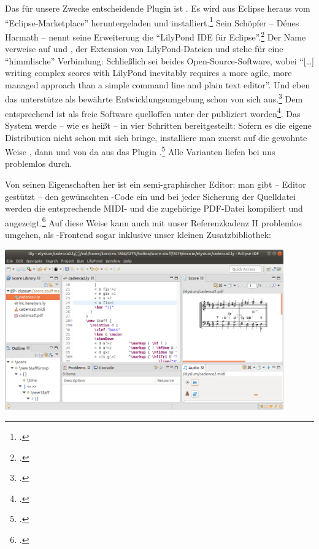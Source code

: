 Das für unsere Zwecke entscheidende Plugin ist . Es wird aus
Eclipse heraus vom \enquote{Eclipse-Marketplace} heruntergeladen und
installiert.\footcite[vgl.][\nopage wp]{Harmath2019a} Sein Schöpfer -- Dénes
Harmath -- nennt seine Erweiterung die \enquote{LilyPond IDE für
Eclipse}.\footcite[vgl.][\nopage wp]{Harmath2019b} Der Name 
verweise auf  und , der Extension von LilyPond-Dateien und
stehe für eine \enquote{himmlische} Verbindung: Schließlich sei beides
Open-Source-Software, wobei \enquote{[\ldots] writing complex scores with
LilyPond inevitably requires a more agile, more managed approach than a simple
command line and plain text editor}. Und eben das unterstütze  als
bewährte Entwicklungsumgebung schon von sich aus.\footcite[vgl.][\nopage
wp]{Harmath2019d} Dem entsprechend ist  als freie Software
quelloffen unter der  publiziert
worden\footcite[vgl.][\nopage wp]{Harmath2018a}. Das System werde -- wie es
heißt -- in vier Schritten bereitgestellt: Sofern es die eigene Distribution
nicht schon mit sich bringe, installiere man zuerst auf die gewohnte Weise
, dann  und von da aus das Plugin
.\footcite[vgl.][\nopage wp]{Harmath2019c} Alle Varianten liefen
bei uns problemlos durch.

Von seinen Eigenschaften her ist  ein semi-graphischer Editor: man
gibt -- Editor gestützt -- den gewünschten -Code ein und bei jeder
Sicherung der Quelldatei werden die entsprechende MIDI- und die zugehörige
PDF-Datei kompiliert und angezeigt.\footcite[vgl.][\nopage wp]{Harmath2019e} Auf
diese Weise kann  auch mit unser Referenzkadenz II problemlos
umgehen, als -Frontend sogar inklusive unser kleinen
Zusatzbibliothek:

\begin{center}
\includegraphics[width=0.9\textwidth]{frontends/elysium/elysium-cadenca2-300dpi.png}
\end{center}

